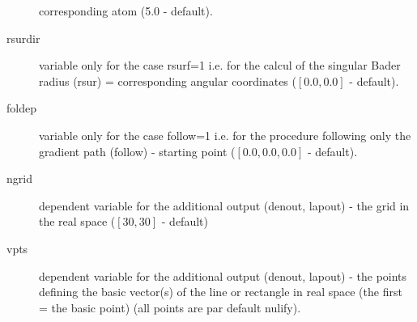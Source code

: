 \documentclass[11pt]{article}
\begin{document}
\begin{description}
corresponding atom (5.0 - default).
\item [rsurdir] variable only for the case rsurf=1 i.e. for the
  calcul of the singular Bader radius (rsur) = corresponding
  angular coordinates ($[0.0,0.0]$ - default).
\item [foldep] variable only for the case follow=1 i.e. for the
procedure following only the gradient path (follow) - starting point
($[0.0,0.0,0.0]$ - default).
\item [ngrid] dependent variable for the additional output
(denout, lapout) - the grid in the real space ($[30,30]$ - default)
\item [vpts] dependent variable for the additional output
(denout, lapout) - the points defining the basic vector(s) of the line
or rectangle in real space (the first = the basic point)
(all points are par default nulify).
\end{description}
\end{document}
